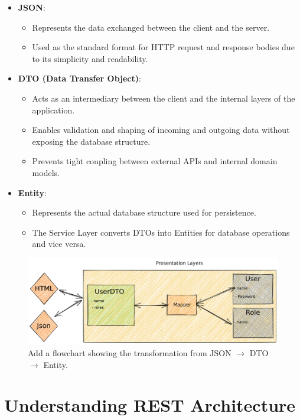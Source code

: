 \documentclass[a4paper,12pt]{article}
\begin{document}
\begin{itemize}
    \item \textbf{JSON}:
    \begin{itemize}
        \item Represents the data exchanged between the client and the server.
        \item Used as the standard format for HTTP request and response bodies due to its simplicity and readability.
    \end{itemize}
    \item \textbf{DTO (Data Transfer Object)}:
    \begin{itemize}
        \item Acts as an intermediary between the client and the internal layers of the application.
        \item Enables validation and shaping of incoming and outgoing data without exposing the database structure.
        \item Prevents tight coupling between external APIs and internal domain models.
    \end{itemize}
    \item \textbf{Entity}:
    \begin{itemize}
        \item Represents the actual database structure used for persistence.
        \item The Service Layer converts DTOs into Entities for database operations and vice versa.
    \end{itemize}
\end{itemize}
\noindent\begin{figure}[h!]
    \centering
    \includegraphics[width=\textwidth]{images/layers-4.jpg}
    \caption{Add a flowchart showing the transformation from JSON $\rightarrow$ DTO $\rightarrow$ Entity.}
    \label{fig:Transformation_JSON_DTO_Entity_diagram}
\end{figure}
\section{Understanding REST Architecture}
\end{document}
